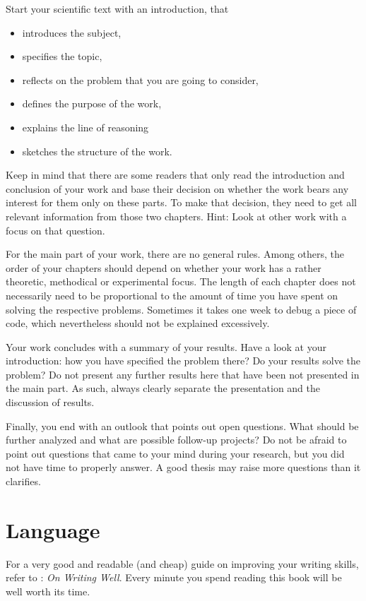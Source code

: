 Start your scientific text with an introduction, that
\begin{itemize}
    \item introduces the subject,
    \item specifies the topic,
    \item reflects on the problem that you are going to consider,
    \item defines the purpose of the work,
    \item explains the line of reasoning
    \item sketches the structure of the work.
\end{itemize}

Keep in mind that there are some readers that only read the introduction and conclusion of your work and base their decision on whether the work bears any interest for them only on these parts. 
To make that decision, they need to get all relevant information from those two chapters. 
Hint: Look at other work with a focus on that question.

For the main part of your work, there are no general rules. 
Among others, the order of your chapters should depend on whether your work has a rather theoretic, methodical or experimental focus. 
The length of each chapter does not necessarily need to be proportional to the amount of time you have spent on solving the respective problems. 
Sometimes it takes one week to debug a piece of code, which nevertheless should not be explained excessively.

Your work concludes with a summary of your results.
Have a look at your introduction: how you have specified the problem there? Do your results solve the problem?
Do not present any further results here that have been not presented in the main part. 
As such, always clearly separate the presentation and the discussion of results.

Finally, you end with an outlook that points out open questions. 
What should be further analyzed and what are possible follow-up projects?
Do not be afraid to point out questions that came to your mind during your research, but you did not have time to properly answer. 
A good thesis may raise more questions than it clarifies.


\section{Language}
For a very good and readable (and cheap) guide on improving your writing skills, refer to \textcite{Zinsser76}: \emph{On Writing Well}.
Every minute you spend reading this book will be well worth its time.

